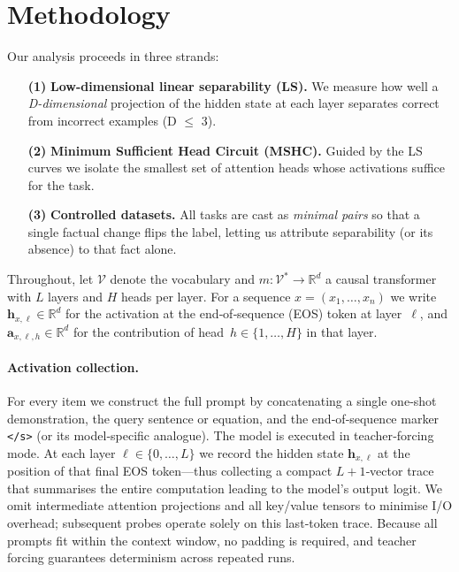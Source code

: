 \documentclass{article}
\begin{document}
\section{Methodology}
\label{sec:methods}

Our analysis proceeds in three strands:

\begin{itemize}[leftmargin=1.3em,itemsep=0.35\baselineskip]
  \item[\textbf{(1)}]   \textbf{Low-dimensional linear separability (LS).}\;
                       We measure how well a \emph{D-dimensional} projection
                       of the hidden state at each layer separates correct from
                       incorrect examples (D $\leq$ 3).
  \item[\textbf{(2)}]   \textbf{Minimum Sufficient Head Circuit (MSHC).}\;
                       Guided by the LS curves we isolate the smallest set of
                       attention heads whose activations suffice for the task.
  \item[\textbf{(3)}]   \textbf{Controlled datasets.}\;
                       All tasks are cast as \emph{minimal pairs} so that a
                       single factual change flips the label, letting us
                       attribute separability (or its absence) to that fact
                       alone.
\end{itemize}

\vspace{-0.25\baselineskip}

Throughout, let $\mathcal{V}$ denote the vocabulary and  
$m:\mathcal{V}^*\!\to\!\mathbb{R}^d$ a causal transformer with $L$ layers and
$H$ heads per layer.  For a sequence
$x=(x_1,\dots,x_n)$ we write $\mathbf h_{x,\ell}\in\mathbb{R}^{d}$ for the activation at
the end‑of‑sequence (EOS) token at layer $\ell$, and
$\mathbf a_{x,\ell,h}\in\mathbb{R}^{d}$ for the contribution of
head $h\in\{1,\dots,H\}$ in that layer.

\paragraph{Activation collection.}
For every item we construct the full prompt by concatenating a single
one‑shot demonstration, the query sentence or equation, and the
end‑of‑sequence marker \texttt{\textless{}/s\textgreater{}} (or its
model‑specific analogue).  The model is executed in teacher‑forcing
mode.  At each layer $\ell\in\{0,\dots,L\}$ we record the hidden state
$\mathbf h_{x,\ell}$ at the position of that final EOS token—thus
collecting a compact $L{+}1$‑vector trace that summarises the entire
computation leading to the model’s output logit.  We omit intermediate
attention projections and all key/value tensors to minimise I/O
overhead; subsequent probes operate solely on this last‑token trace.
Because all prompts fit within the context window, no padding is
required, and teacher forcing guarantees determinism across repeated
runs.
\end{document}
